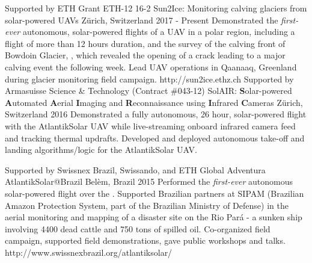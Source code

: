 \label{sec:proj}
\begin{cventries}
  \cvprojentry
    {Supported by ETH Grant ETH-12 16-2} %
    {Sun2Ice: Monitoring calving glaciers from solar-powered UAVs} %
    {Z\"{u}rich, Switzerland} %
    {2017 - Present} %
    {Demonstrated the \emph{first-ever} autonomous, solar-powered flights of a UAV in a polar region, including a flight of more than 12 hours duration, and the survey of the calving front of Bowdoin Glacier, , which revealed the opening of a crack leading to a major calving event the following week.} %
    {Lead UAV operations in Qaanaaq, Greenland during glacier monitoring field campaign.} %
	{http://sun2ice.ethz.ch}
  \cvprojentry
    {Supported by Armasuisse Science \& Technology (Contract \#043-12)} %
    {SolAIR: \textbf{S}olar-powered \textbf{A}utomated \textbf{A}erial \textbf{I}maging and \textbf{R}econnaissance using \textbf{I}nfrared \textbf{C}ameras} %
    {Z\"{u}rich, Switzerland} %
    {2016} %
    {Demonstrated a fully autonomous, 26 hour, solar-powered flight with the AtlantikSolar UAV while live-streaming onboard infrared camera feed and tracking thermal updrafts.} %
    {Developed and deployed autonomous take-off and landing algorithms/logic for the AtlantikSolar UAV.} %
	{}
	
  \cvprojentry
    {Supported by Swissnex Brazil, Swissando, and ETH Global} %
    {Adventura AtlantikSolar@Brazil} %
    {Bel\`{e}m, Brazil} %
    {2015} %
    {Performed the \emph{first-ever} autonomous solar-powered flight over the . Supported Brazilian partners at SIPAM (Brazilian Amazon Protection System, part of the Brazilian Ministry of Defense) in the aerial monitoring and mapping of a disaster site on the Rio Pará - a sunken ship involving 4400 dead cattle and 750 tons of spilled oil.} %
    {Co-organized field campaign, supported field demonstrations, gave public workshops and talks.} %
	{http://www.swissnexbrazil.org/atlantiksolar/}
	

\end{cventries}
